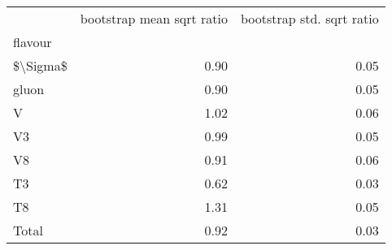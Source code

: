 \begin{tabular}{lrr}
\toprule
{} &  bootstrap mean sqrt ratio &  bootstrap std. sqrt ratio \\
flavour  &                            &                            \\
\midrule
\$\textbackslash Sigma\$ &                       0.90 &                       0.05 \\
gluon    &                       0.90 &                       0.05 \\
V        &                       1.02 &                       0.06 \\
V3       &                       0.99 &                       0.05 \\
V8       &                       0.91 &                       0.06 \\
T3       &                       0.62 &                       0.03 \\
T8       &                       1.31 &                       0.05 \\
Total    &                       0.92 &                       0.03 \\
\bottomrule
\end{tabular}
